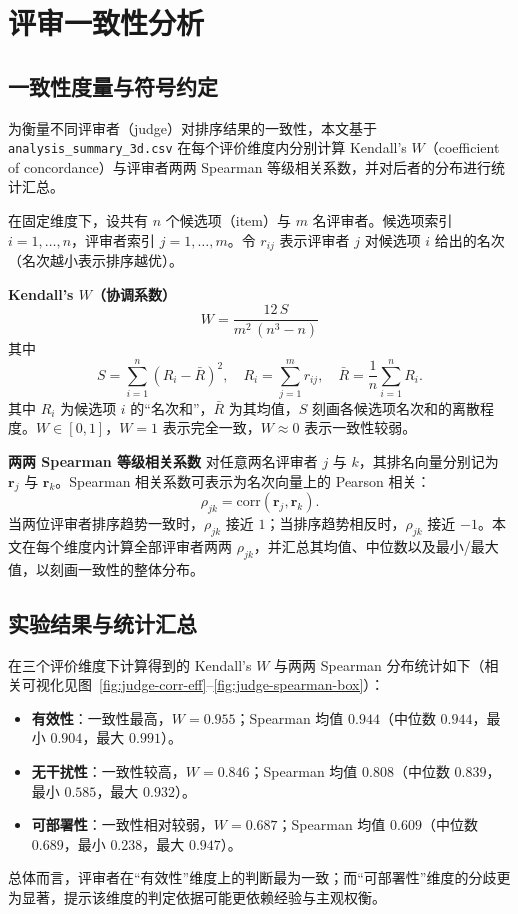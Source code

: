 \section{评审一致性分析}


\subsection{一致性度量与符号约定}
为衡量不同评审者（judge）对排序结果的一致性，本文基于 \texttt{analysis\_summary\_3d.csv} 在每个评价维度内分别计算 Kendall’s $W$（coefficient of concordance）与评审者两两 Spearman 等级相关系数，并对后者的分布进行统计汇总。

在固定维度下，设共有 $n$ 个候选项（item）与 $m$ 名评审者。候选项索引 $i=1,\dots,n$，评审者索引 $j=1,\dots,m$。令 $r_{ij}$ 表示评审者 $j$ 对候选项 $i$ 给出的名次（名次越小表示排序越优）。

\textbf{Kendall’s $W$（协调系数）}
\begin{equation}
W = \frac{12\,S}{m^2\,(n^3-n)}
\end{equation}
其中
\begin{equation}
S=\sum_{i=1}^{n}(R_i-\bar{R})^2,\quad R_i=\sum_{j=1}^{m} r_{ij},\quad \bar{R}=\frac{1}{n}\sum_{i=1}^{n}R_i.
\end{equation}
其中 $R_i$ 为候选项 $i$ 的“名次和”，$\bar{R}$ 为其均值，$S$ 刻画各候选项名次和的离散程度。$W\in[0,1]$，$W=1$ 表示完全一致，$W\approx 0$ 表示一致性较弱。

\textbf{两两 Spearman 等级相关系数}
对任意两名评审者 $j$ 与 $k$，其排名向量分别记为 $\mathbf{r}_j$ 与 $\mathbf{r}_k$。Spearman 相关系数可表示为名次向量上的 Pearson 相关：
\begin{equation}
\rho_{jk}=\mathrm{corr}(\mathbf{r}_j,\mathbf{r}_k).
\end{equation}
当两位评审者排序趋势一致时，$\rho_{jk}$ 接近 $1$；当排序趋势相反时，$\rho_{jk}$ 接近 $-1$。本文在每个维度内计算全部评审者两两 $\rho_{jk}$，并汇总其均值、中位数以及最小/最大值，以刻画一致性的整体分布。

\subsection{实验结果与统计汇总}
在三个评价维度下计算得到的 Kendall’s $W$ 与两两 Spearman 分布统计如下（相关可视化见图~\ref{fig:judge-corr-eff}--\ref{fig:judge-spearman-box}）：
\begin{itemize}
	\item \textbf{有效性}：一致性最高，$W=0.955$；Spearman 均值 $0.944$（中位数 $0.944$，最小 $0.904$，最大 $0.991$）。
	\item \textbf{无干扰性}：一致性较高，$W=0.846$；Spearman 均值 $0.808$（中位数 $0.839$，最小 $0.585$，最大 $0.932$）。
	\item \textbf{可部署性}：一致性相对较弱，$W=0.687$；Spearman 均值 $0.609$（中位数 $0.689$，最小 $0.238$，最大 $0.947$）。
\end{itemize}
总体而言，评审者在“有效性”维度上的判断最为一致；而“可部署性”维度的分歧更为显著，提示该维度的判定依据可能更依赖经验与主观权衡。

